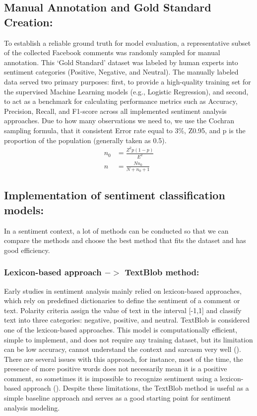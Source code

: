 \documentclass[twoside]{article}
\begin{document}
\subsection{Manual Annotation and Gold Standard Creation:}
To establish a reliable ground truth for model evaluation, a representative subset of the collected Facebook comments was randomly sampled for manual annotation. This ‘Gold Standard’ dataset was labeled by human experts into sentiment categories (Positive, Negative, and Neutral). The manually labeled data served two primary purposes: first, to provide a high-quality training set for the supervised Machine Learning models (e.g., Logistic Regression), and second, to act as a benchmark for calculating performance metrics such as Accuracy, Precision, Recall, and F1-score across all implemented sentiment analysis approaches.
Due to how many observations we need to, we use the Cochran sampling formula, that it consistent Error rate equal to 3\%, Z0.95, and p is the proportion of the population (generally taken as 0.5).
\begin{align}
	n_0 &= \frac{Z^2 p(1 - p)}{E^2} \\
	n &= \frac{N n_0}{N + n_0 + 1}
\end{align}

\subsection{Implementation of sentiment classification models:}
In a sentiment context, a lot of methods can be conducted so that we can compare the methods and choose the best method that fits the dataset and has good efficiency.

\subsubsection{Lexicon-based approach $->$ TextBlob method:}
Early studies in sentiment analysis mainly relied on lexicon-based approaches, which rely on predefined dictionaries to define the sentiment of a comment or text. Polarity criteria assign the value of text in the interval [-1,1] and classify text into three categories: negative, positive, and neutral. TextBlob is considered one of the lexicon-based approaches. This model is computationally efficient, simple to implement, and does not require any training dataset, but its limitation can be low accuracy, cannot understand the context and sarcasm very well (\cite{Singhal:2016}). There are several issues with this approach, for instance, most of the time, the presence of more positive words does not necessarily mean it is a positive comment, so sometimes it is impossible to recognize sentiment using a lexicon-based approach (\cite{Gudivada:2015}).
Despite these limitations, the TextBlob method is useful as a simple baseline approach and serves as a good starting point for sentiment analysis modeling. 
\end{document}
